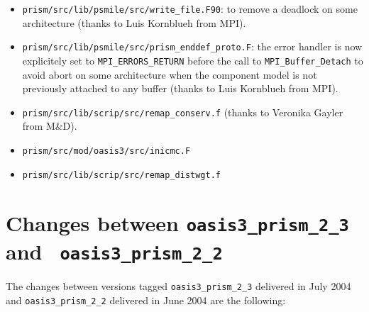 \begin{itemize}
\begin{itemize}
\item
\texttt{prism/src/lib/psmile/src/write\_file.F90}: to remove a deadlock
on some architecture (thanks to Luis Kornblueh from MPI).

\item
\texttt{prism/src/lib/psmile/src/prism\_enddef\_proto.F}: the error
handler is now explicitely set to \texttt{MPI\_ERRORS\_RETURN} before
the call to \texttt{MPI\_Buffer\_Detach} to avoid abort on some
architecture when the component model is not previously attached to
any buffer (thanks to Luis Kornblueh from MPI). 



\item 
  \texttt{prism/src/lib/scrip/src/remap\_conserv.f} (thanks to Veronika
  Gayler from M\&D).

\item \texttt{prism/src/mod/oasis3/src/inicmc.F}

\item \texttt{prism/src/lib/scrip/src/remap\_distwgt.f}

\end{itemize}

\end{itemize}

\section{Changes between {\tt oasis3\_prism\_2\_3} and {\tt
oasis3\_prism\_2\_2}}

The changes between versions tagged {\tt oasis3\_prism\_2\_3}
delivered in July 2004 and {\tt oasis3\_prism\_2\_2} delivered
in June 2004 are the following:

